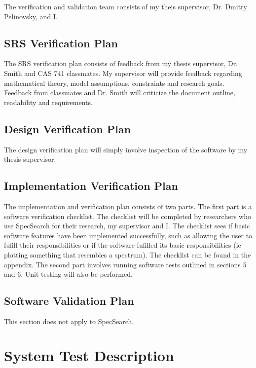 \documentclass[12pt, titlepage]{article}
\begin{document}
The verification and validation team consists of my theis supervisor, Dr. 
Dmitry Pelinovsky, and I. \\

\subsection{SRS Verification Plan}

The SRS verification plan consists of feedback from my thesis supervisor, Dr. 
Smith and CAS 741 classmates. My supervisor will provide feedback regarding 
mathematical theory, model assumptions, constraints and research goals. 
Feedback from classmates and Dr. Smith will criticize the document outline, 
readability and requirements. \\

\subsection{Design Verification Plan}

The design verification plan will simply involve inspection of the software by 
my thesis supervisor. \\ 

\subsection{Implementation Verification Plan}

The implementation and verification plan consists of two parts. The first part 
is a software verification checklist. The checklist will be completed by 
researchers who use SpecSearch for their research, my supervisor and I. The 
checklist sees if basic software features have been implemented successfully, 
such as 
allowing the user to fufill their responsibilities or if the software fufilled 
its basic responsibilities (ie plotting something that resembles a spectrum). 
The checklist can be found in the appendix. The 
second part involves running software tests 
outlined in sections 5 and 6. Unit testing will also be performed. 

\subsection{Software Validation Plan}

This section does not apply to SpecSearch. 

\section{System Test Description}
	
\end{document}

